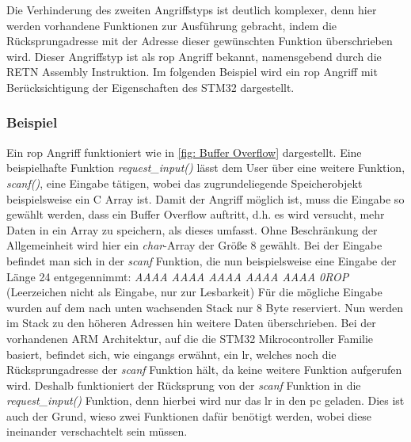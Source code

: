 \documentclass[a4paper,
DIV=13,
12pt,
BCOR=10mm,
department=FakIM,
oneside,
parskip=half,
automark,
listof=totocnumbered,
bibliography=totocnumbered,
acronym=totocnumbered
] {OTHRartcl}
\begin{document}
Die Verhinderung des zweiten Angriffstyps ist deutlich komplexer, denn hier werden vorhandene Funktionen zur Ausführung gebracht, indem die Rücksprungadresse mit der Adresse
dieser gewünschten Funktion überschrieben wird. %
Dieser Angriffstyp ist als \ac{rop} Angriff bekannt, namensgebend durch die RETN Assembly Instruktion.
Im folgenden Beispiel wird ein \ac{rop} Angriff mit Berücksichtigung der Eigenschaften des STM32 dargestellt.

\subsubsection{Beispiel}
Ein \ac{rop} Angriff funktioniert wie in \autoref{fig: Buffer Overflow} dargestellt.
Eine beispielhafte Funktion \textit{request\_input()} lässt dem User über eine weitere Funktion, \textit{scanf()}, eine Eingabe tätigen, wobei das zugrundeliegende Speicherobjekt beispielsweise ein C Array ist.
Damit der Angriff möglich ist, muss die Eingabe so gewählt werden, dass ein Buffer Overflow auftritt, d.h. es wird versucht, mehr Daten in ein Array zu speichern, als dieses umfasst.
Ohne Beschränkung der Allgemeinheit wird hier ein \textit{char}-Array der Größe $8$ gewählt. Bei der Eingabe befindet man sich in der \textit{scanf} Funktion, die nun beispielsweise eine Eingabe der Länge 24 entgegennimmt:
\textit{AAAA AAAA AAAA AAAA AAAA 0ROP}  (Leerzeichen nicht als Eingabe, nur zur Lesbarkeit)
Für die mögliche Eingabe wurden auf dem nach unten wachsenden Stack nur 8 Byte reserviert.
Nun werden im Stack zu den höheren Adressen hin weitere Daten überschrieben.
Bei der vorhandenen ARM Architektur, auf die die STM32 Mikrocontroller Familie basiert, befindet sich, wie eingangs erwähnt, ein \ac{lr}, welches noch die Rücksprungadresse der \textit{scanf} Funktion hält, da keine weitere Funktion aufgerufen wird.
Deshalb funktioniert der Rücksprung von der \textit{scanf} Funktion in die \textit{request\_input()} Funktion, denn hierbei wird nur das \ac{lr} in den \ac{pc} geladen.
Dies ist auch der Grund, wieso zwei Funktionen dafür benötigt werden, wobei diese ineinander verschachtelt sein müssen.
\end{document}
